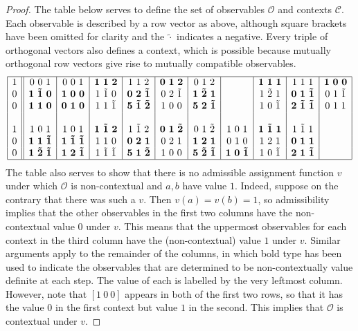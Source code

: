 \documentclass[11pt, a4paper]{article}
\theoremstyle{definition}
\newcommand{\m}[1]{\tilde{#1}}
\begin{document}
\begin{proof}
	The table below serves to define the set of observables $\mathcal{O}$ and contexts $\mathcal{C}$.
	Each observable is described by a row vector as above, although square brackets have been omitted for clarity and the $\m\cdot$ indicates a negative.
	Every triple of orthogonal vectors also defines a context, which is possible because mutually orthogonal row vectors give rise to mutually compatible observables.
	$$\begin{array}{|c||c|c|c|c|c|c|c|c|c|c|}
		\hline
		1 & 0~0~1         & 0~0~1         & \bf 1~1~2   & 1~1~2         & \bf 0~1~2   & 0~1~2         &             & \bf 1~1~1   & 1~1~1         & \bf 1~0~0 \\
		0 & \bf 1~\m1~0   & \bf 1~0~0     & 1~\m1~0     & \bf 0~2~\m1   & 0~2~\m1     & \bf 1~\m2~1   &             & 1~\m2~1     & \bf 0~1~\m1   & 0~1~\m1   \\
		0 & \bf 1~1~0     & \bf 0~1~0     & 1~1~\m1     & \bf 5~\m1~\m2 & 1~0~0       & \bf 5~2~\m1   &             & 1~0~\m1     & \bf 2~\m1~\m1 & 0~1~1     \\
		  &               &               &             &               &             &               &             &             &               &           \\
		1 & 1~0~1         & 1~0~1         & \bf 1~\m1~2 & 1~\m1~2       & \bf 0~1~\m2 & 0~1~\m2       & 1~0~1       & \bf 1~\m1~1 & 1~\m1~1       &           \\
		0 & \bf 1~1~\m1   & \bf 1~\m1~\m1 & 1~1~0       & \bf 0~2~1     & 0~2~1       & \bf 1~2~1     & 0~1~0       & 1~2~1       & \bf 0~1~1     &           \\
		0 & \bf 1~\m2~\m1 & \bf 1~2~\m1   & 1~\m1~\m1   & \bf 5~1~\m2   & 1~0~0       & \bf 5~\m2~\m1 & \bf 1~0~\m1 & 1~0~\m1     & \bf 2~1~\m1   &           \\
		\hline
	\end{array}$$
	The table also serves to show that there is no admissible assignment function $v$ under which $\mathcal{O}$ is non-contextual and $a, b$ have value $1$.
	Indeed, suppose on the contrary that there was such a $v$.
	Then $v(a) = v(b) = 1$, so admissibility implies that the other observables in the first two columns have the non-contextual value $0$ under $v$.
	This means that the uppermost observables for each context in the third column have the (non-contextual) value $1$ under $v$.
	Similar arguments apply to the remainder of the columns, in which bold type has been used to indicate the observables that are determined to be non-contextually value definite at each step.
	The value of each is labelled by the very leftmost column.
	However, note that $[1~0~0]$ appears in both of the first two rows, so that it has the value $0$ in the first context but value $1$ in the second.
	This implies that $\mathcal{O}$ is contextual under $v$.
\end{proof}
\end{document}
